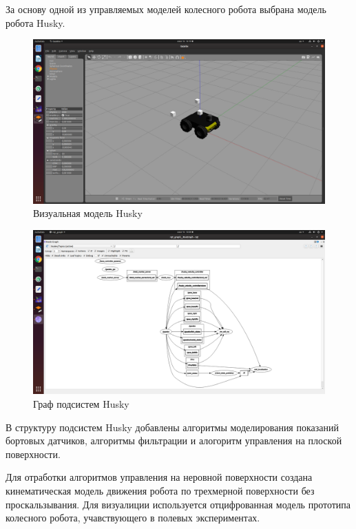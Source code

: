 \documentclass[a4paper,12pt]{article}
\begin{document}
За основу одной из управляемых моделей колесного робота выбрана модель робота Husky.
\begin{figure}[h!]
	\centering
	\includegraphics[width=14cm,clip]{pic/husky_gazebo}
	\caption{Визуальная модель Husky}
	\label{pic:husky_gazebo}
\end{figure}
\begin{figure}[h!]
	\centering
	\includegraphics[width=14cm,clip]{pic/husky_rqt_plot}
	\caption{Граф подсистем Husky}
	\label{pic:husky_rqt_plot}
\end{figure}
В структуру подсистем Husky добавлены алгоритмы моделирования показаний бортовых датчиков, алгоритмы фильтрации и алогоритм управления на плоской поверхности.

Для отработки алгоритмов управления на неровной поверхности создана кинематическая модель движения робота по трехмерной поверхности без проскальзывания. Для визуалиции используется отцифрованная модель прототипа колесного робота, учавствующего в полевых экспериментах.
\end{document}
